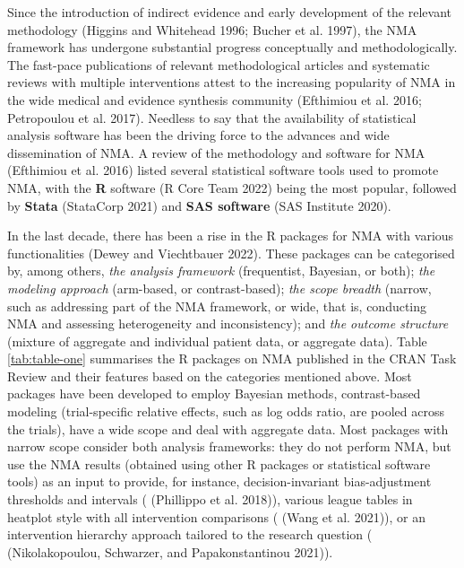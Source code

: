 Since the introduction of indirect evidence and early development of the relevant
methodology (Higgins and Whitehead 1996; Bucher et al. 1997), the NMA framework has undergone substantial
progress conceptually and methodologically. The fast-pace publications of relevant
methodological articles and systematic reviews with multiple interventions attest
to the increasing popularity of NMA in the wide medical and evidence synthesis
community (Efthimiou et al. 2016; Petropoulou et al. 2017). Needless to say that the availability
of statistical analysis software has been the driving force to the advances and
wide dissemination of NMA. A review of the methodology and software for NMA
(Efthimiou et al. 2016) listed several statistical software tools used to promote NMA, with
the \textbf{R} software (R Core Team 2022) being the most popular, followed by \textbf{Stata} (StataCorp 2021)
and \textbf{SAS software} (SAS Institute 2020).

In the last decade, there has been a rise in the R packages for NMA with various
functionalities (Dewey and Viechtbauer 2022). These packages can be categorised by, among
others, \emph{the analysis framework} (frequentist, Bayesian, or both);
\emph{the modeling approach} (arm-based, or contrast-based); \emph{the scope breadth}
(narrow, such as addressing part of the NMA framework, or wide, that is, conducting
NMA and assessing heterogeneity and inconsistency); and \emph{the outcome structure}
(mixture of aggregate and individual patient data, or aggregate data). Table
\ref{tab:table-one} summarises the R packages on NMA published in the CRAN Task Review and their features
based on the categories mentioned above. Most packages have been developed to employ
Bayesian methods, contrast-based modeling (trial-specific relative effects, such
as log odds ratio, are pooled across the trials), have a wide scope and deal with
aggregate data. Most packages with narrow scope consider both analysis frameworks:
they do not perform NMA, but use the NMA results (obtained using other R packages
or statistical software tools) as an input to provide, for instance, decision-invariant
bias-adjustment thresholds and intervals ( (Phillippo et al. 2018)),
various league tables in heatplot style with all intervention comparisons
( (Wang et al. 2021)), or an intervention hierarchy approach
tailored to the research question ( (Nikolakopoulou, Schwarzer, and Papakonstantinou 2021)).

